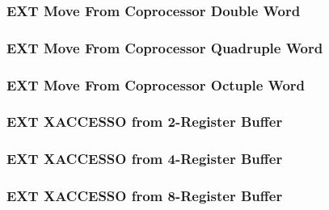 \subsubsection[{\small EXT Move From Coprocessor Double Word}]{EXT Move From Coprocessor Double Word} \label{sec:format-EXT-XMOVEFD}



\subsubsection[{\small EXT Move From Coprocessor Quadruple Word}]{EXT Move From Coprocessor Quadruple Word} \label{sec:format-EXT-XMOVEFQ}



\subsubsection[{\small EXT Move From Coprocessor Octuple Word}]{EXT Move From Coprocessor Octuple Word} \label{sec:format-EXT-XMOVEFO}



\subsubsection[{\small EXT XACCESSO from 2-Register Buffer}]{EXT XACCESSO from 2-Register Buffer} \label{sec:format-EXT-XACCESSO2}



\subsubsection[{\small EXT XACCESSO from 4-Register Buffer}]{EXT XACCESSO from 4-Register Buffer} \label{sec:format-EXT-XACCESSO4}



\subsubsection[{\small EXT XACCESSO from 8-Register Buffer}]{EXT XACCESSO from 8-Register Buffer} \label{sec:format-EXT-XACCESSO8}

